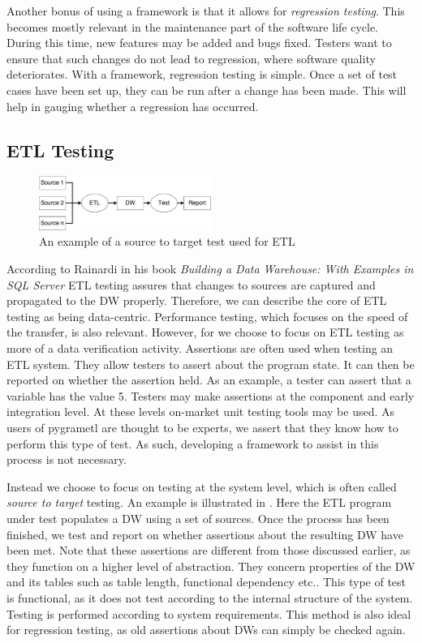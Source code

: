 Another bonus of using a framework is that it allows for \emph{regression testing}. This becomes mostly relevant in the maintenance part of the software life cycle. During this time, new features may be added and bugs fixed. Testers want to ensure that such changes do not lead to regression, where software quality deteriorates. With a framework, regression testing is simple. Once a set of test cases have been set up, they can be run after a change has been made. This will help in gauging whether a regression has occurred.

\subsection{ETL Testing}

\begin{figure}
\centering
\includegraphics[width=0.5\textwidth]{figures/scenario.pdf}
\caption{An example of a source to target test used for ETL}
\label{fig:sourcetotarget}
\end{figure}

According to Rainardi in his book \textit{Building a Data Warehouse: With Examples in SQL Server}\cite{rainardi2007building} ETL testing assures that changes to sources are captured and propagated to the DW properly. Therefore, we can describe the core of ETL testing as being data-centric. Performance testing, which focuses on the speed of the transfer, is also relevant. However, for \FW{} we choose to focus on ETL testing as more of a data verification activity. Assertions are often used when testing an ETL system. They allow testers to assert about the program state. It can then be reported on whether the assertion held. As an example, a tester can assert that a variable has the value 5. Testers may make assertions at the component and early integration level. At these levels on-market unit testing tools may be used. As users of pygrametl are thought to be experts, we assert that they know how to perform this type of test. As such, developing a framework to assist in this process is not necessary.

Instead we choose to focus on testing at the system level, which is often called \emph{source to target} testing. An example is illustrated in . Here the ETL program under test populates a DW using a set of sources. Once the process has been finished, we test and report on whether assertions about the resulting DW have been met. Note that these assertions are different from those discussed earlier, as they function on a higher level of abstraction. They concern properties of the DW and its tables such as table length, functional dependency etc.. This type of test is functional, as it does not test according to the internal structure of the system. Testing is performed according to system requirements. This method is also ideal for regression testing, as old assertions about DWs can simply be checked again.

